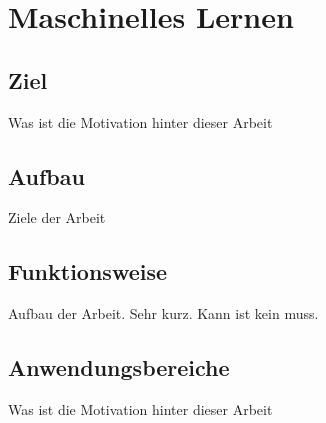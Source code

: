 \chapter{Maschinelles Lernen}
\label{chap:maschinellesLernen}

\section{Ziel}
\label{sec:ziel}
Was ist die Motivation hinter dieser Arbeit

\section{Aufbau}
\label{sec:aufbau}
Ziele der Arbeit

\section{Funktionsweise}
\label{sec:funktionsweise}
Aufbau der Arbeit. Sehr kurz. Kann ist kein muss.

\section{Anwendungsbereiche}
\label{sec:anwendungsbereiche}
Was ist die Motivation hinter dieser Arbeit